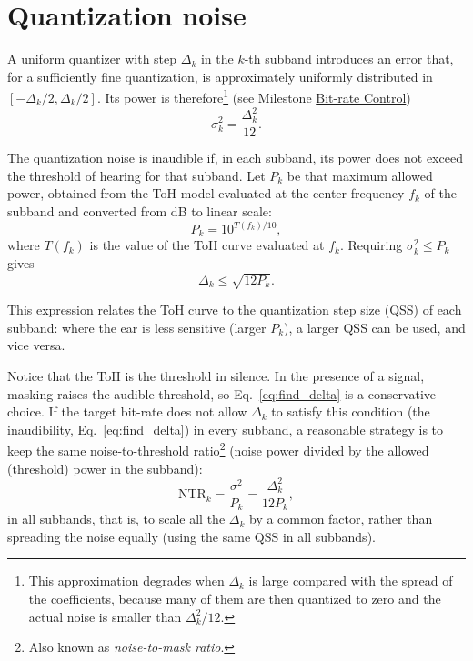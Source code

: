 \section{Quantization noise}
A uniform quantizer with step $\Delta_k$ in the $k$-th subband
introduces an error that, for a sufficiently fine quantization, is
approximately uniformly distributed in $[-\Delta_k/2,
  \Delta_k/2]$. Its power is therefore\footnote{This approximation
degrades when $\Delta_k$ is large compared with the spread of the
coefficients, because many of them are then quantized to zero and the
actual noise is smaller than $\Delta_k^2/12$.} (see Milestone
\href{https://tecnologias-multimedia.github.io/contents/BR_control/}{Bit-rate
  Control})
\begin{equation}
  \sigma_k^2 = \frac{\Delta_k^2}{12}.
\end{equation}

The quantization noise is inaudible if, in each subband, its power
does not exceed the threshold of hearing for that subband. Let $P_k$
be that maximum allowed power, obtained from the ToH model evaluated
at the center frequency $f_k$ of the subband and converted from dB to
linear scale:
\begin{equation}
  P_k = 10^{T(f_k)/10},
\end{equation}
where $T(f_k)$ is the value of the ToH curve evaluated at $f_k$.
Requiring $\sigma _k^2 \le P_k$ gives
\begin{equation}
   \Delta_k \le \sqrt{12 P_k}.
  \label{eq:find_delta}
\end{equation}

This expression relates the ToH curve to the quantization step size
(QSS) of each subband: where the ear is less sensitive (larger $P_k$),
a larger QSS can be used, and vice versa.

Notice that the ToH is the threshold in silence. In the presence of a
signal, masking raises the audible threshold, so
Eq.~\eqref{eq:find_delta} is a conservative choice. If the target
bit-rate does not allow $\Delta_k$ to satisfy this condition (the
inaudibility, Eq.~\eqref{eq:find_delta}) in every subband, a
reasonable strategy is to keep the same noise-to-threshold
ratio\footnote{Also known as \emph{noise-to-mask ratio}.}  (noise
power divided by the allowed (threshold) power in the subband):
\begin{equation}
  \text{NTR}_k = \frac{\sigma^2}{P_k} = \frac{\Delta_k^2}{12P_k},
\end{equation}
in all subbands, that is, to scale all the $\Delta_k$ by a common
factor, rather than spreading the noise equally (using the same QSS in
all subbands).

